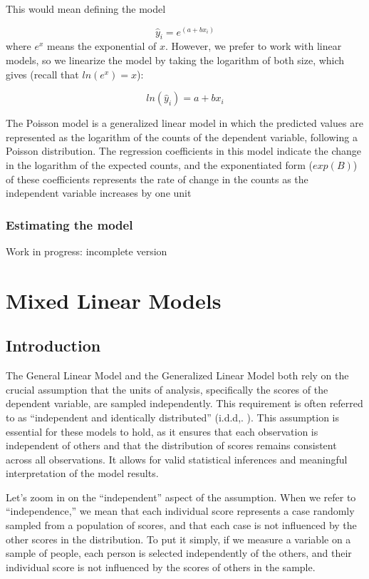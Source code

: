 \documentclass[
]{book}
\begin{document}
This would mean defining the model

\[
\hat{y}_i=e^{(a+bx_i)}
\]
where \(e^x\) means the exponential of \(x\). However, we prefer to work with linear models, so we linearize the model by taking the logarithm of both size, which gives (recall that \(ln(e^x)=x\)):

\[
ln(\hat{y}_i)=a+bx_i
\]

The Poisson model is a generalized linear model in which the predicted values are represented as the logarithm of the counts of the dependent variable, following a Poisson distribution. The regression coefficients in this model indicate the change in the logarithm of the expected counts, and the exponentiated form (\(exp(B)\)) of these coefficients represents the rate of change in the counts as the independent variable increases by one unit

\hypertarget{estimating-the-model}{%
\subsection{Estimating the model}\label{estimating-the-model}}

{ Work in progress: incomplete version }

\hypertarget{mixed}{%
\chapter{Mixed Linear Models}\label{mixed}}

\hypertarget{introduction-1}{%
\section{Introduction}\label{introduction-1}}

The General Linear Model and the Generalized Linear Model both rely on the crucial assumption that the units of analysis, specifically the scores of the dependent variable, are sampled independently. This requirement is often referred to as ``independent and identically distributed'' (i.d.d,.
). This assumption is essential for these models to hold, as it ensures that each observation is independent of others and that the distribution of scores remains consistent across all observations. It allows for valid statistical inferences and meaningful interpretation of the model results.

Let's zoom in on the ``independent'' aspect of the assumption. When we refer to ``independence,'' we mean that each individual score represents a case randomly sampled from a population of scores, and that each case is not influenced by the other scores in the distribution. To put it simply, if we measure a variable on a sample of people, each person is selected independently of the others, and their individual score is not influenced by the scores of others in the sample.
\end{document}
